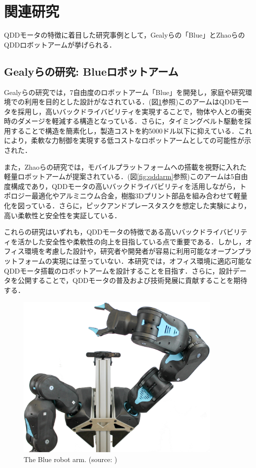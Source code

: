 
\section{関連研究}
QDDモータの特徴に着目した研究事例として，Gealyらの「Blue」とZhaoらのQDDロボットアームが挙げられる．\cite{gealy2019quasidirectdrivelowcostcompliant}\cite{10106520}
\subsection{Gealyらの研究: Blueロボットアーム}
Gealyらの研究では，7自由度のロボットアーム「Blue」を開発し，家庭や研究環境での利用を目的とした設計がなされている．(図\ref{fig:blue}参照)このアームはQDDモータを採用し，高いバックドライバビリティを実現することで，物体や人との衝突時のダメージを軽減する構造となっている．さらに，タイミングベルト駆動を採用することで構造を簡素化し，製造コストを約5000ドル以下に抑えている．これにより，柔軟な力制御を実現する低コストなロボットアームとしての可能性が示された．

また，Zhaoらの研究では，モバイルプラットフォームへの搭載を視野に入れた軽量ロボットアームが提案されている．(図\ref{fig:qddarm}参照)このアームは5自由度構成であり，QDDモータの高いバックドライバビリティを活用しながら，トポロジー最適化やアルミニウム合金，樹脂3Dプリント部品を組み合わせて軽量化を図っている．さらに，ピックアンドプレースタスクを想定した実験により，高い柔軟性と安全性を実証している．

これらの研究はいずれも，QDDモータの特徴である高いバックドライバビリティを活かした安全性や柔軟性の向上を目指している点で重要である．しかし，オフィス環境を考慮した設計や，研究者や開発者が容易に利用可能なオープンプラットフォームの実現には至っていない．本研究では，オフィス環境に適応可能なQDDモータ搭載のロボットアームを設計することを目指す．さらに，設計データを公開することで，QDDモータの普及および技術発展に貢献することを期待する．

\begin{figure}[h]
  \centering
  \includegraphics[width=10cm]{images/twoArmTeaser.jpg}
  \caption{The Blue robot arm. (source: \cite{gealy2019quasidirectdrivelowcostcompliant})}
  \label{fig:blue}
\end{figure}

